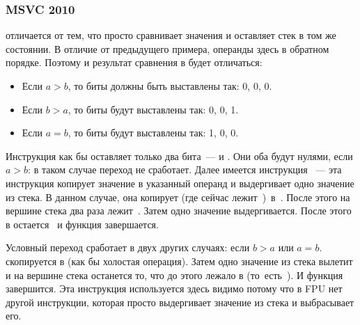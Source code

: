 \subsubsection{\Optimizing MSVC 2010}



\FCOM отличается от \FCOMP тем, что просто сравнивает значения и оставляет стек в том же состоянии. 
В отличие от предыдущего примера, операнды здесь в обратном порядке. 
Поэтому и результат сравнения в \CThreeBits будет отличаться:

\begin{itemize}
\item Если $a>b$, то биты \CThreeBits должны быть выставлены так: 0, 0, 0.
\item Если $b>a$, то биты будут выставлены так: 0, 0, 1.
\item Если $a=b$, то биты будут выставлены так: 1, 0, 0.
\end{itemize}

Инструкция  как бы оставляет только два бита~--- \Cthree и \Czero. 
Они оба будут нулями, если $a>b$: в таком случае переход \JNE не сработает. 
Далее имеется инструкция ~--- эта инструкция копирует 
значение  в указанный операнд и выдергивает одно значение из стека. В данном случае, 
она копирует  
(где сейчас лежит~)~в~. 
После этого на вершине стека два раза лежит~. Затем одно значение выдергивается. 
После этого в  остается~ и функция завершается.

Условный переход \JNE сработает в двух других случаях: если $b>a$ или $a=b$. 
 скопируется в  (как бы холостая операция). 
Затем одно значение из стека вылетит и на вершине стека останется то, что 
до этого лежало в  (то~есть~). И функция завершится. 
Эта инструкция используется здесь видимо потому что в FPU 
нет другой инструкции, которая просто выдергивает 
значение из стека и выбрасывает его.

\ifdefined\IncludeOlly

\fi

